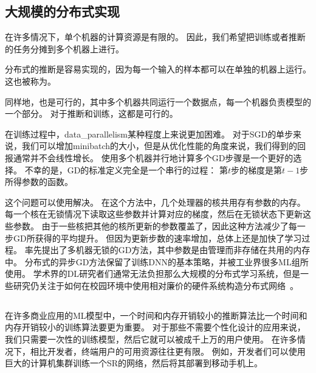 \subsection{大规模的分布式实现}
\label{sec:large_scale_distributed_implementations}

在许多情况下，单个机器的计算资源是有限的。
因此，我们希望把训练或者推断的任务分摊到多个机器上进行。

分布式的推断是容易实现的，因为每一个输入的样本都可以在单独的机器上运行。
这也被称为。

同样地，也是可行的，其中多个机器共同运行一个数据点，每一个机器负责模型的一个部分。
对于推断和训练，这都是可行的。



在训练过程中，\gls{data_parallelism}某种程度上来说更加困难。
对于\gls{SGD}的单步来说，我们可以增加\gls{minibatch}的大小，但是从优化性能的角度来说，我们得到的回报通常并不会线性增长。
使用多个机器并行地计算多个\gls{GD}步骤是一个更好的选择。
不幸的是，\gls{GD}的标准定义完全是一个串行的过程：
第$t$步的梯度是第$t-1$步所得参数的函数。


这个问题可以使用\citep{BenDucVin01-small,Recht-et-al-NIPS2011}解决。
在这个方法中，几个处理器的核共用存有参数的内存。
每一个核在无锁情况下读取这些参数并计算对应的梯度，然后在无锁状态下更新这些参数。
由于一些核把其他的核所更新的参数覆盖了，因此这种方法减少了每一步\gls{GD}所获得的平均提升。
但因为更新步数的速率增加，总体上还是加快了学习过程。
\citet{Dean-et-al-NIPS2012}率先提出了多机器无锁的\gls{GD}方法，其中参数是由管理而非存储在共用的内存中。
分布式的异步\gls{GD}方法保留了训练\gls{DNN}的基本策略，并被工业界很多\gls{ML}组所使用\citep{chilimbi2014project,Wu-et-al-arXiv2015}。
学术界的\gls{DL}研究者们通常无法负担那么大规模的分布式学习系统，但是一些研究仍关注于如何在校园环境中使用相对廉价的硬件系统构造分布式网络~\citep{icml2013_coates13}。


\subsection{}
\label{sec:model_compression}

在许多商业应用的\gls{ML}模型中，一个时间和内存开销较小的推断算法比一个时间和内存开销较小的训练算法要更为重要。
对于那些不需要个性化设计的应用来说，我们只需要一次性的训练模型，然后它就可以被成千上万的用户使用。
在许多情况下，相比开发者，终端用户的可用资源往往更有限。
例如，开发者们可以使用巨大的计算机集群训练一个\gls{SR}的网络，然后将其部署到移动手机上。


